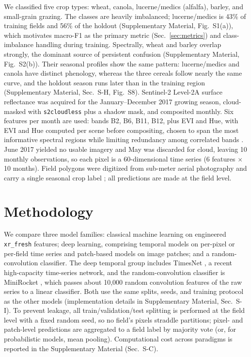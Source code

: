 \documentclass[preprint,authoryear]{elsarticle}
\begin{document}
We classified five crop types: wheat, canola, lucerne/medics (alfalfa), barley, and small-grain grazing. The classes are heavily imbalanced; lucerne/medics is 43\% of training fields and 56\% of the holdout (Supplementary Material, Fig.~S1(a)), which motivates macro-F1 as the primary metric (Sec.~\ref{sec:metrics}) and class-imbalance handling during training. Spectrally, wheat and barley overlap strongly, the dominant source of persistent confusion (Supplementary Material, Fig.~S2(b)). Their seasonal profiles show the same pattern: lucerne/medics and canola have distinct phenology, whereas the three cereals follow nearly the same curve, and the holdout season runs later than in the training region (Supplementary Material, Sec.~S-H, Fig.~S8). Sentinel-2 Level-2A surface reflectance was acquired for the January--December 2017 growing season, cloud-masked with \texttt{s2cloudless} plus a shadow mask, and composited monthly. Six features per month are used: bands B2, B6, B11, B12, plus EVI and Hue, with EVI and Hue computed per scene before compositing, chosen to span the most informative spectral regions while limiting redundancy among correlated bands \citep{mann2023, tufail2025cnnrnn}. June 2017 yielded no usable imagery and May was discarded for cloud, leaving 10 monthly observations, so each pixel is a 60-dimensional time series (6 features $\times$ 10 months). Field polygons were digitized from sub-meter aerial photography and carry a single seasonal crop label \citep{mlhub}; all predictions are made at the field level.

\section{Methodology}
We compare three model families: classical machine learning on engineered \texttt{xr\_fresh} features; deep learning, comprising temporal models on per-pixel or per-field time series and patch-based models on image patches; and a random-convolution classifier. The deep temporal group includes TimesNet \citep{timesnet2023}, a recent high-capacity time-series network, and the random-convolution classifier is MiniRocket \citep{minirocket2021}, which passes about 10{,}000 random convolution features of the raw series to a linear classifier. Both use the same splits, seeds, and training protocol as the other models (implementation details in Supplementary Material, Sec.~S-I). To prevent leakage, all train/validation/test splitting is performed at the field level with a fixed random seed, so no field's pixels straddle partitions; pixel- and patch-level predictions are aggregated to a field label by majority vote (or, for probabilistic models, mean pooling). Computational cost across paradigms is reported in the Supplementary Material (Sec.~S-C).
\end{document}

